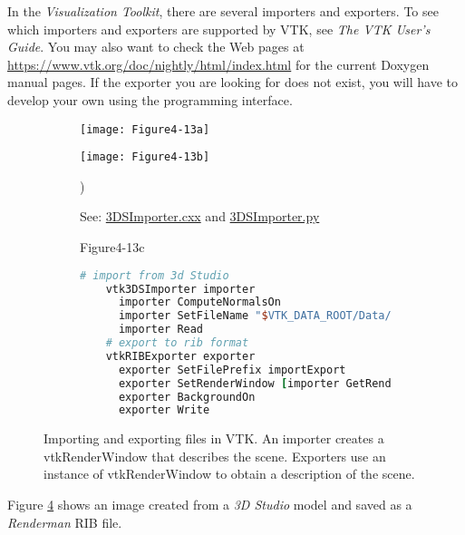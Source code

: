 In the \emph{Visualization Toolkit}, there are several importers and exporters. To see which importers and exporters are supported by VTK, see \emph{The VTK User's Guide}. You may also want to check the Web pages at \href{https://www.vtk.org/doc/nightly/html/index.html}{https://www.vtk.org/doc/nightly/html/index.html} for the current Doxygen manual pages. If the exporter you are looking for does not exist, you will have to develop your own using the programming interface.

\begin{figure}[htb]
  \begin{subfigure}[h]{0.48\linewidth}
    \texttt{[image: Figure4-13a]}
    \caption*{}
    \label{fig:Figure4-13a}
  \end{subfigure}
  \hfill
  \begin{subfigure}[h]{0.48\linewidth}
    \texttt{[image: Figure4-13b]}
    \caption*{See:  \href{https://lorensen.github.io/VTKExamples/site/Cxx/IO/3DSImporter/}{3DSImporter.cxx} and \href{https://lorensen.github.io/VTKExamples/site/Python/IO/3DSImporter/}{3DSImporter.py}})
    \label{fig:Figure4-13b}
  \end{subfigure}
  \hfill
  \begin{subfigure}[h]{0.96\linewidth}{Figure4-13c}
  \begin{lstlisting}[language=TCL,  caption={}, numbers=none, frame=none]
    # import from 3d Studio
    vtk3DSImporter importer
      importer ComputeNormalsOn
      importer SetFileName "$VTK_DATA_ROOT/Data/iflamigm.3ds"
      importer Read
    # export to rib format
    vtkRIBExporter exporter
      exporter SetFilePrefix importExport
      exporter SetRenderWindow [importer GetRenderWindow]
      exporter BackgroundOn
      exporter Write
    \end{lstlisting} 
    \caption*{}
    \label{fig:Figure4-13c}
  \end{subfigure}
  \caption{Importing and exporting files in VTK. An importer creates a vtkRenderWindow that describes the scene. Exporters use an instance of vtkRenderWindow to obtain a description of the scene.}\label{fig:Figure4-13}
\end{figure}

Figure \ref{fig:Figure4-13} shows an image created from a \emph{3D Studio} model and saved as a \emph{Renderman} RIB file.

